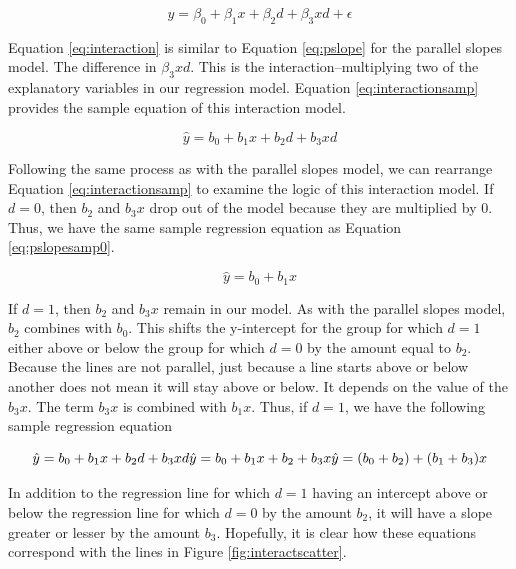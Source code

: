 \documentclass[
]{book}
\begin{document}
\begin{equation}
y = \beta_0 + \beta_1x + \beta_2d + \beta_3xd + \epsilon
\label{eq:interaction}
\end{equation}

Equation \eqref{eq:interaction} is similar to Equation \eqref{eq:pslope} for the parallel slopes model. The difference in \(\beta_3xd\). This is the interaction--multiplying two of the explanatory variables in our regression model. Equation \eqref{eq:interactionsamp} provides the sample equation of this interaction model.

\begin{equation}
\hat{y} = b_0 + b_1x + b_2d + b_3xd
\label{eq:interactionsamp}
\end{equation}

Following the same process as with the parallel slopes model, we can rearrange Equation \eqref{eq:interactionsamp} to examine the logic of this interaction model. If \(d=0\), then \(b_2\) and \(b_3x\) drop out of the model because they are multiplied by 0. Thus, we have the same sample regression equation as Equation \eqref{eq:pslopesamp0}.

\begin{equation}
\hat{y} = b_0 + b_1x
\label{eq:interactionsamp0}
\end{equation}

If \(d=1\), then \(b_2\) and \(b_3x\) remain in our model. As with the parallel slopes model, \(b_2\) combines with \(b_0\). This shifts the y-intercept for the group for which \(d=1\) either above or below the group for which \(d=0\) by the amount equal to \(b_2\). Because the lines are not parallel, just because a line starts above or below another does not mean it will stay above or below. It depends on the value of the \(b_3x\). The term \(b_3x\) is combined with \(b_1x\). Thus, if \(d=1\), we have the following sample regression equation

\begin{equation}
\hat{y} = b_0 + b_1x + b_2d + b_3xd\\
\hat{y} = b_0 + b_1x + b_2 + b_3x\\
\hat{y} = (b_0 + b_2) + (b_1 + b_3)x
\label{eq:interactionsamp1}
\end{equation}

In addition to the regression line for which \(d=1\) having an intercept above or below the regression line for which \(d=0\) by the amount \(b_2\), it will have a slope greater or lesser by the amount \(b_3\). Hopefully, it is clear how these equations correspond with the lines in Figure \ref{fig:interactscatter}.
\end{document}
